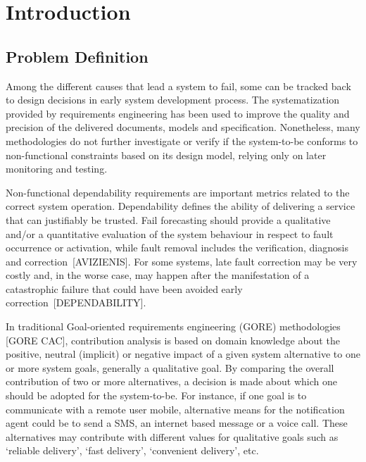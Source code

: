 \chapter{Introduction}\label{ch_introduction}%

\section{Problem Definition}

Among the different causes that lead a system to fail, some can be tracked back to design decisions in early system development process. The systematization provided by requirements engineering has been used to improve the quality and precision of the delivered documents, models and specification. Nonetheless, many methodologies do not further investigate or verify if the system-to-be conforms to non-functional constraints based on its design model, relying only on later monitoring and testing.


Non-functional dependability requirements are important metrics related to the correct system operation. Dependability defines the ability of delivering a service that can justifiably be trusted. Fail forecasting should provide a qualitative and/or a quantitative evaluation of the system behaviour in respect to fault occurrence or activation, while fault removal includes the verification, diagnosis and correction~[AVIZIENIS]. For some systems, late fault correction may be very costly and, in the worse case, may happen after the manifestation of a catastrophic failure that could have been avoided early correction~[DEPENDABILITY].

In traditional Goal-oriented requirements engineering (GORE) methodologies [GORE CAC], contribution  analysis is based on domain knowledge about the positive, neutral (implicit) or negative impact of a given system alternative to one or more system goals, generally a qualitative goal. By  comparing the overall contribution of two or more alternatives, a decision is made about which one should be adopted for the system-to-be. For instance, if one goal is to communicate with a remote user mobile, alternative means for the notification agent could be to send a SMS, an internet based message or a voice call. These alternatives may contribute with different values for qualitative goals such as `reliable delivery', `fast delivery', `convenient delivery', etc. 

